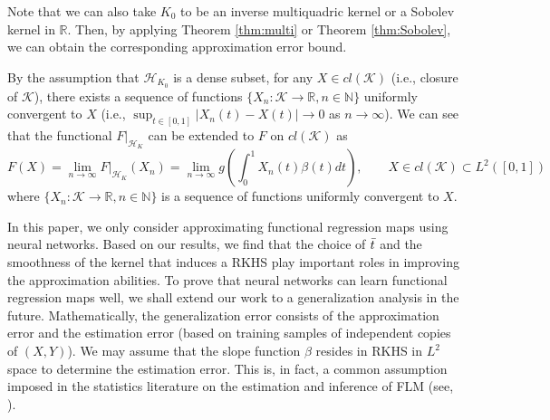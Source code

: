 \documentclass{article}
\def\NN{\mathbb N}
\def\RR{\mathbb R}
\numberwithin{equation}{section}
\begin{document}
Note that we can also take $K_0$ to be an inverse multiquadric kernel or a Sobolev kernel in $\RR$. Then, by applying Theorem \ref{thm:multi} or Theorem \ref{thm:Sobolev}, we can obtain the corresponding approximation error bound. 

By the assumption that $\mathcal{H}_{K_0}$ is a dense subset, for any $X\in cl(\mathcal{K})$ (i.e., closure of $\mathcal{K}$), there exists a sequence of functions $\{X_n: \mathcal{K} \to \RR, n\in \NN\}$ uniformly convergent to $X$ (i.e., $\sup_{t\in [0,1]}|X_n(t) - X(t)| \to 0$ as $n\to \infty$). 
We can see that the functional $F|_{\mathcal{H}_K}$ can be extended to $F$ on $cl(\mathcal{K})$ as
     \begin{equation*}
         F(X) = \lim_{n\to \infty} F|_{\mathcal{H}_K} (X_n) = \lim_{n\to \infty} g\left(\int_0^1 X_n(t) \beta(t) dt\right),\qquad X\in cl(\mathcal{K})\subset L^2([0,1])
     \end{equation*}
     where $\{X_n: \mathcal{K} \to \RR, n\in \NN\}$ is a sequence of functions uniformly convergent to $X$. 

   In this paper, we only consider approximating functional regression maps using neural networks. Based on our results, we find that the choice of $\Bar{t}$ and the smoothness of the kernel that induces a RKHS play important roles in improving the approximation abilities. 
   To prove that neural networks can learn functional regression maps well, we shall extend our work to a generalization analysis in the future.
   Mathematically, the generalization error consists of the approximation error and the estimation error (based on training samples of independent copies of $(X,Y)$). 
   We may assume that the slope function $\beta$ resides in RKHS in $L^2$ space to determine the estimation error. 
   This is, in fact, a common assumption imposed in the statistics literature on the estimation and inference of FLM (see, \citep{yuan2010reproducing, shang2015nonparametric,balasubramanian2022unified}).  
 
\end{document}
